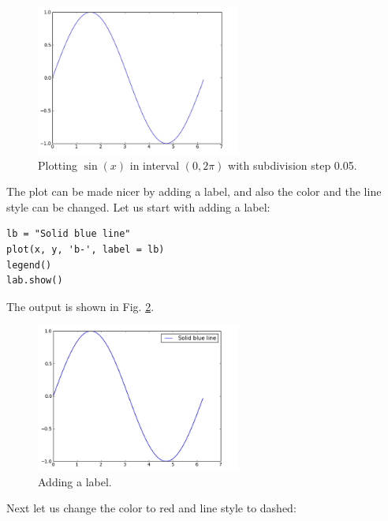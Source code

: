 \documentclass[article,A4,12pt]{llncs}
\begin{document}
\begin{figure}[!ht]
\begin{center}
\includegraphics[width=0.6\textwidth]{img/plot1.png}
\end{center}
\vspace{-6mm}
\caption{Plotting $\sin(x)$ in interval $(0, 2\pi)$ with subdivision step 0.05.}
\label{fig:plot1}
\end{figure}
\noindent
The plot can be made nicer by adding a label, and also the color 
and the line style can be changed. Let us start with adding a label:

\begin{verbatim}
lb = "Solid blue line"
plot(x, y, 'b-', label = lb)
legend()
lab.show()
\end{verbatim}
The output is shown in Fig. \ref{fig:plot2}.
\newpage

\begin{figure}[!ht]
\begin{center}
\includegraphics[width=0.6\textwidth]{img/plot2.png}
\end{center}
\vspace{-6mm}
\caption{Adding a label.}
\label{fig:plot2}
\end{figure}

\noindent
Next let us change the color to red and line style to dashed: 
\end{document}
